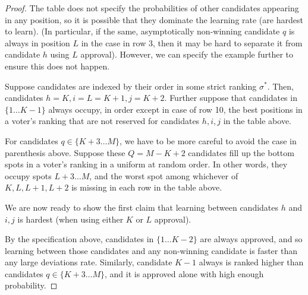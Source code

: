 \documentclass[10pt]{article}
\begin{document}
\begin{ReviewVerbatim}
\begin{proof}
%


The table does not specify the probabilities of other candidates appearing in any position, so it is possible that they dominate the learning rate (are hardest to learn). (In particular, if the same, asymptotically non-winning candidate $q$ is always in position $L$ in the case in row $3$, then it may be hard to separate it from candidate $h$ using $L$ approval). However, we can specify the example further to ensure this does not happen.

%
%

Suppose candidates are indexed by their order in some strict ranking $\sigma^*$. Then, candidates $h=K, i = L=K+1, j = K+2$. Further suppose that candidates in $\{1 \dots K-1 \}$ always occupy, in order except in case of row 10, the best positions in a voter's ranking that are not reserved for candidates $h,i,j$ in the table above. %

%

For candidates $q\in\{K+3 \dots M \}$, we have to be more careful to avoid the case in parenthesis above. Suppose these $Q = M-K+2$ candidates fill up the bottom spots in a voter's ranking in a uniform at random order. In other words, they occupy spots $L+3 \dots M$, and the worst spot among whichever of $K, L, L+1,L+2$ is missing in each row in the table above.




We are now ready to show the first claim that learning between candidates $h$ and $i,j$ is hardest (when using either $K$ or $L$ approval).

By the specification above, candidates in $\{1 \dots K-2 \}$ are always approved, and so learning between those candidates and any non-winning candidate is faster than any large deviations rate. Similarly, candidate $K-1$ always is ranked higher than candidates $q\in\{K+3 \dots M \}$, and it is approved alone with high enough probability. %

%



%
%


\end{proof}
\end{ReviewVerbatim}
\end{document}
